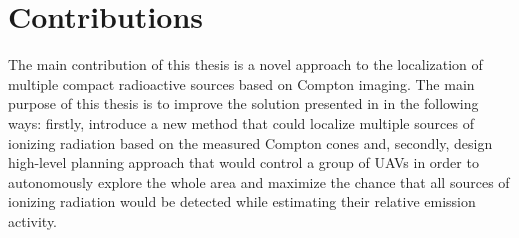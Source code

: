 {%



















}%
\section{Contributions}
The main contribution of this thesis is a novel approach to the localization of multiple compact radioactive sources based on Compton imaging.
The main purpose of this thesis is to improve the solution presented in \cite{baca2021gamma} in the following ways: 
firstly, introduce a new method that could localize multiple sources of ionizing radiation based on the measured Compton cones and, 
secondly, 
design high-level planning approach that would control a group of \ac{UAV}s in order to autonomously explore the whole area and maximize the chance that all sources of ionizing radiation would be detected while estimating their relative emission activity.

